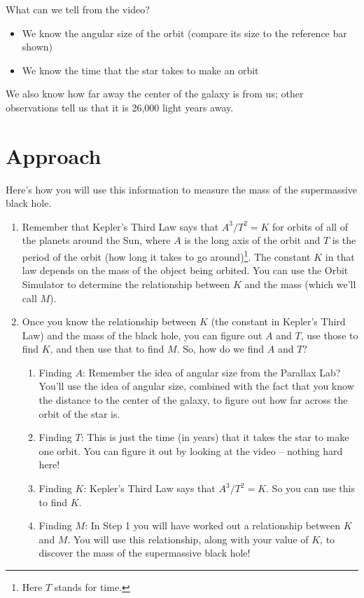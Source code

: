 \documentclass[11pt]{article}
\begin{document}
What can we tell from the video?

\begin{itemize}
\item We know the angular size of the orbit (compare its size to the reference bar shown)
\item We know the time that the star takes to make an orbit 
\end{itemize}

We also know how far away the center of the galaxy is from us; other observations tell us that it is 26,000 light years away.


\section{Approach}

Here’s how you will use this information to measure the mass of the supermassive black hole.

\begin{enumerate}

\item Remember that Kepler’s Third Law says that $A^3 / T^2 = K$ for orbits of all of the planets around the Sun, where $A$ is the long axis of the orbit and $T$ is the period of the orbit (how long it takes to go around)\footnote{Here $T$ stands for time.}. The constant $K$ in that law depends on the mass of the object being orbited. You can use the Orbit Simulator to determine the relationship between $K$ and the mass (which we’ll call $M$).
\item Once you know the relationship between $K$ (the constant in Kepler’s Third Law) and the mass of the black hole, you can figure out $A$ and $T$, use those to find $K$, and then use that to find $M$. So, how do we find $A$ and $T$?

\begin{enumerate}

\item Finding $A$: Remember the idea of angular size from the Parallax Lab? You’ll use the idea of angular size, combined with the fact that you know the distance to the center of the galaxy, to figure out how far across the orbit of the star is.

\item Finding $T$: This is just the time (in years) that it takes the star to make one orbit. You can figure it out by looking at the video -- nothing hard here!

\item Finding $K$: Kepler’s Third Law says that $A^3 / T^2 = K$. So you can use this to find $K$.

\item Finding $M$: In Step 1 you will have worked out a relationship between $K$ and $M$. You will use this relationship, along with your value of $K$, to discover the mass of the supermassive black hole!
\end{enumerate}
\end{enumerate}
\end{document}
